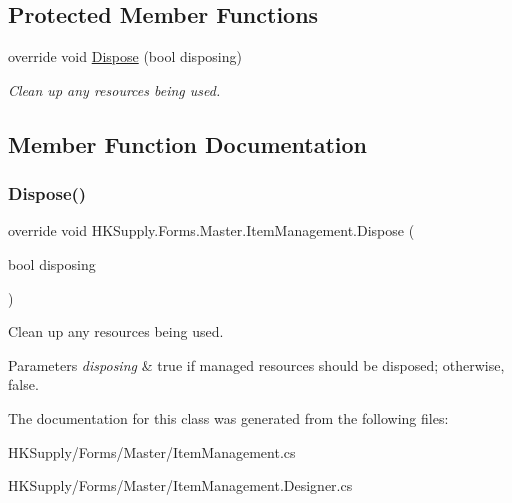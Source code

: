 \subsection*{Protected Member Functions}
\begin{DoxyCompactItemize}
\item 
override void \hyperlink{class_h_k_supply_1_1_forms_1_1_master_1_1_item_management_a0196cf04e25d7b8837be1fd54f84de0b}{Dispose} (bool disposing)
\begin{DoxyCompactList}\small\item\em Clean up any resources being used. \end{DoxyCompactList}\end{DoxyCompactItemize}


\subsection{Member Function Documentation}
\mbox{\label{class_h_k_supply_1_1_forms_1_1_master_1_1_item_management_a0196cf04e25d7b8837be1fd54f84de0b}} 
\subsubsection{\texorpdfstring{Dispose()}{Dispose()}}
{\footnotesize\ttfamily override void H\+K\+Supply.\+Forms.\+Master.\+Item\+Management.\+Dispose (\begin{DoxyParamCaption}\item[{bool}]{disposing }\end{DoxyParamCaption})\hspace{0.3cm}{\ttfamily [protected]}}



Clean up any resources being used. 


\begin{DoxyParams}{Parameters}
{\em disposing} & true if managed resources should be disposed; otherwise, false.\\
\hline
\end{DoxyParams}


The documentation for this class was generated from the following files\+:\begin{DoxyCompactItemize}
\item 
H\+K\+Supply/\+Forms/\+Master/Item\+Management.\+cs\item 
H\+K\+Supply/\+Forms/\+Master/Item\+Management.\+Designer.\+cs\end{DoxyCompactItemize}
